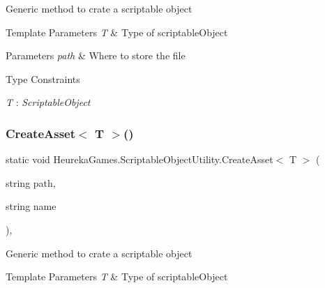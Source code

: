 Generic method to crate a scriptable object 


\begin{DoxyTemplParams}{Template Parameters}
{\em T} & Type of scriptable\+Object\\
\hline
\end{DoxyTemplParams}

\begin{DoxyParams}{Parameters}
{\em path} & Where to store the file\\
\hline
\end{DoxyParams}
\begin{Desc}
\item[Type Constraints]\begin{description}
\item[{\em T} : {\em Scriptable\+Object}]\end{description}
\end{Desc}
\mbox{\label{class_heureka_games_1_1_scriptable_object_utility_aab36c4d05b9cc324fde0ba92ef2b82d1}} 
\subsubsection{\texorpdfstring{Create\+Asset$<$ T $>$()}{CreateAsset< T >()}\hspace{0.1cm}{\footnotesize\ttfamily [2/2]}}
{\footnotesize\ttfamily static void Heureka\+Games.\+Scriptable\+Object\+Utility.\+Create\+Asset$<$ T $>$ (\begin{DoxyParamCaption}\item[{string}]{path,  }\item[{string}]{name }\end{DoxyParamCaption})\hspace{0.3cm}{\ttfamily [inline]}, {\ttfamily [static]}}



Generic method to crate a scriptable object 


\begin{DoxyTemplParams}{Template Parameters}
{\em T} & Type of scriptable\+Object\\
\hline
\end{DoxyTemplParams}

